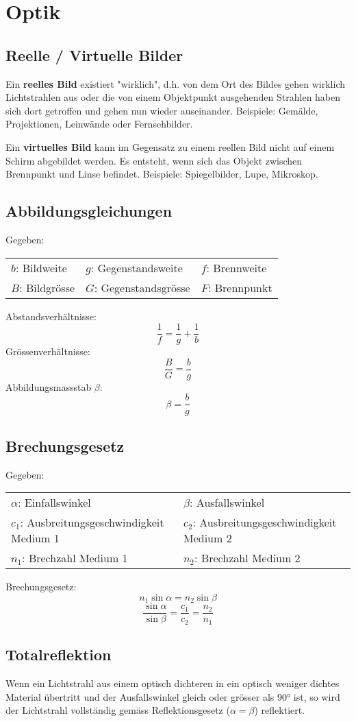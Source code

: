 \section{Optik}

\subsection{Reelle / Virtuelle Bilder}

Ein \textbf{reelles Bild} existiert "wirklich", d.h. von dem Ort des Bildes
gehen wirklich Lichtstrahlen aus oder die von einem Objektpunkt ausgehenden
Strahlen haben sich dort getroffen und gehen nun wieder auseinander. Beispiele:
Gemälde, Projektionen, Leinwände oder Fernsehbilder.

Ein \textbf{virtuelles Bild} kann im Gegensatz zu einem reellen Bild nicht auf
einem Schirm abgebildet werden. Es entsteht, wenn sich das Objekt zwischen
Brennpunkt und Linse befindet. Beispiele: Spiegelbilder, Lupe, Mikroskop.

\subsection{Abbildungsgleichungen}

Gegeben:

\begin{tabular}{lll}
	$b$: Bildweite & $g$: Gegenstandsweite & $f$: Brennweite \\
	$B$: Bildgrösse & $G$: Gegenstandsgrösse & $F$: Brennpunkt
\end{tabular}

Abstandsverhältnisse:
\[
	\frac{1}{f} = \frac{1}{g} + \frac{1}{b}
\]
Grössenverhältnisse:
\[
	\frac{B}{G} = \frac{b}{g}
\]
Abbildungsmassstab $\beta$:
\[
	\beta = \frac{b}{g}
\]

\subsection{Brechungsgesetz}

Gegeben:

\begin{tabular}{ll}
	$\alpha$: Einfallswinkel & $\beta$: Ausfallswinkel \\
	$c_1$: Ausbreitungsgeschwindigkeit Medium 1 & $c_2$: Ausbreitungsgeschwindigkeit Medium 2 \\
	$n_1$: Brechzahl Medium 1 & $n_2$: Brechzahl Medium 2
\end{tabular}

Brechungsgesetz:
\[
	n_1 \sin \alpha = n_2 \sin \beta
\]
\[
	\frac{\sin \alpha}{\sin \beta} = \frac{c_1}{c_2} = \frac{n_2}{n_1}
\]

\subsection{Totalreflektion}

Wenn ein Lichtstrahl aus einem optisch dichteren in ein optisch weniger dichtes
Material übertritt und der Ausfallswinkel gleich oder grösser als 90° ist, so
wird der Lichtstrahl vollständig gemäss Reflektionsgesetz ($\alpha = \beta$)
reflektiert.
